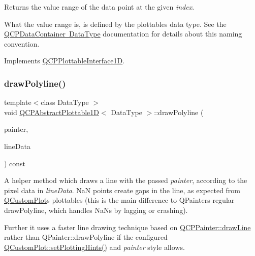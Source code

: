 Returns the value range of the data point at the given {\itshape index}.

What the value range is, is defined by the plottable\textquotesingle{}s data type. See the \mbox{\hyperlink{class_q_c_p_data_container_qcpdatacontainer-datatype}{Q\+C\+P\+Data\+Container Data\+Type}} documentation for details about this naming convention. 

Implements \mbox{\hyperlink{class_q_c_p_plottable_interface1_d_a9ca7fcf14d885a200879768679b19be9}{Q\+C\+P\+Plottable\+Interface1D}}.

\mbox{\label{class_q_c_p_abstract_plottable1_d_a7adc6c3cccebb5341f11e0c2b7d54206}} 
\subsubsection{\texorpdfstring{drawPolyline()}{drawPolyline()}}
{\footnotesize\ttfamily template$<$class Data\+Type $>$ \\
void \mbox{\hyperlink{class_q_c_p_abstract_plottable1_d}{Q\+C\+P\+Abstract\+Plottable1D}}$<$ Data\+Type $>$\+::draw\+Polyline (\begin{DoxyParamCaption}\item[{\mbox{\hyperlink{class_q_c_p_painter}{Q\+C\+P\+Painter}} $\ast$}]{painter,  }\item[{const Q\+Vector$<$ Q\+PointF $>$ \&}]{line\+Data }\end{DoxyParamCaption}) const\hspace{0.3cm}{\ttfamily [protected]}}

A helper method which draws a line with the passed {\itshape painter}, according to the pixel data in {\itshape line\+Data}. NaN points create gaps in the line, as expected from \mbox{\hyperlink{class_q_custom_plot}{Q\+Custom\+Plot}}\textquotesingle{}s plottables (this is the main difference to Q\+Painter\textquotesingle{}s regular draw\+Polyline, which handles Na\+Ns by lagging or crashing).

Further it uses a faster line drawing technique based on \mbox{\hyperlink{class_q_c_p_painter_a0b4b1b9bd495e182c731774dc800e6e0}{Q\+C\+P\+Painter\+::draw\+Line}} rather than {\ttfamily Q\+Painter\+::draw\+Polyline} if the configured \mbox{\hyperlink{class_q_custom_plot_a94a33cbdadbbac5934843508bcfc210d}{Q\+Custom\+Plot\+::set\+Plotting\+Hints()}} and {\itshape painter} style allows. \mbox{\label{class_q_c_p_abstract_plottable1_d_ad0b46d25cde3d035b180fb8f10c056e6}} 
